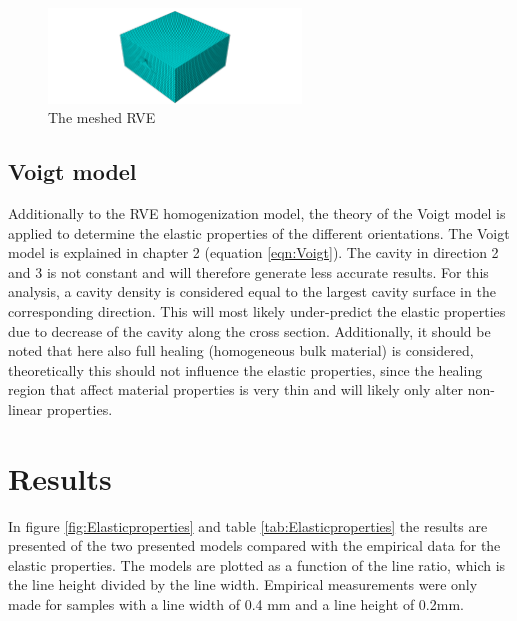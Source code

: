 \begin{figure}[H]
    \centering
    \includegraphics[width=0.60\textwidth]{chapter_6_Elasticmodelling/figures/mesh.png}
    \caption{The meshed RVE}
    \label{fig:mesh}
\end{figure}
\subsection{Voigt model}
Additionally to the RVE homogenization model, the theory of the Voigt model is applied to determine the elastic properties of the different orientations. The Voigt model is explained in chapter 2 (equation \ref{eqn:Voigt}). The cavity in direction 2 and 3 is not constant and will therefore generate less accurate results. For this analysis, a cavity density is considered equal to the largest cavity surface in the corresponding direction. This will most likely under-predict the elastic properties due to decrease of the cavity along the cross section. Additionally, it should be noted that here also full healing (homogeneous bulk material) is considered, theoretically this should not influence the elastic properties, since the healing region that affect material properties is very thin and will likely only alter non-linear properties. 

\section{Results}
In figure \ref{fig:Elasticproperties}  and table \ref{tab:Elasticproperties} the results are presented of the two presented models compared with the empirical data for the elastic properties.  The models are plotted as a function of the line ratio, which is the line height divided by the line width. Empirical measurements were only made for samples with a line width of 0.4 mm and a line height of 0.2mm.


